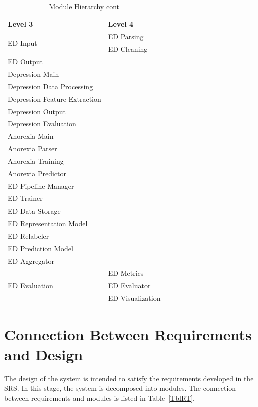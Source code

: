 \documentclass[12pt, titlepage]{article}
\begin{document}
\begin{table}[H]
\centering
\begin{tabular}{p{} p{}}
\toprule
\textbf{Level 3} & \textbf{Level 4}\\

\midrule
\multirow{2}{*}{ED Input} & ED Parsing\\
& ED Cleaning\\ \midrule
ED Output &\\
\midrule

Depression Main &\\ 
Depression Data Processing &\\
Depression Feature Extraction &\\
Depression Output &\\ 
Depression Evaluation &\\ \midrule
Anorexia Main &\\ 
Anorexia Parser &\\
Anorexia Training &\\
Anorexia Predictor &\\ \midrule
ED Pipeline Manager &\\
ED Trainer &\\
ED Data Storage &\\
ED Representation Model &\\
ED Relabeler &\\
ED Prediction Model &\\
ED Aggregator &\\ \midrule
\multirow{3}{*}{ED Evaluation} & ED Metrics\\
& ED Evaluator\\
& ED Visualization\\

\bottomrule

\end{tabular}
\caption{Module Hierarchy cont}
\label{TblMH2}
\end{table}

\newpage

\section{Connection Between Requirements and Design} \label{SecConnection}

The design of the system is intended to satisfy the requirements developed in
the SRS. In this stage, the system is decomposed into modules. The connection
between requirements and modules is listed in Table~\ref{TblRT}.
\end{document}
